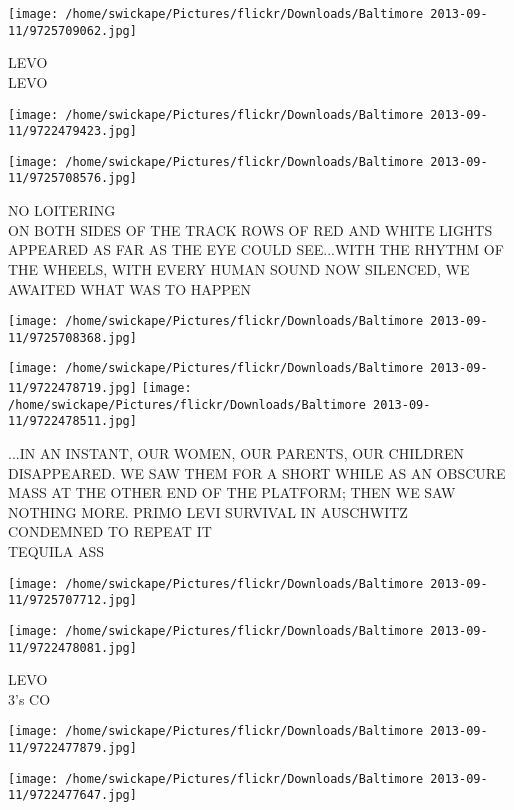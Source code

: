 \documentclass[10pt,letterpaper]{article}
\begin{document}
\vspace{0.25in}
\texttt{[image: /home/swickape/Pictures/flickr/Downloads/Baltimore 2013-09-11/9725709062.jpg]}

LEVO\\
LEVO
\pagebreak

\texttt{[image: /home/swickape/Pictures/flickr/Downloads/Baltimore 2013-09-11/9722479423.jpg]}

\vspace{0.25in}
\texttt{[image: /home/swickape/Pictures/flickr/Downloads/Baltimore 2013-09-11/9725708576.jpg]}

NO LOITERING\\
ON BOTH SIDES OF THE TRACK ROWS OF RED AND WHITE LIGHTS APPEARED AS FAR AS THE EYE COULD SEE...WITH THE RHYTHM OF THE WHEELS, WITH EVERY HUMAN SOUND NOW SILENCED, WE AWAITED WHAT WAS TO HAPPEN
\pagebreak

\texttt{[image: /home/swickape/Pictures/flickr/Downloads/Baltimore 2013-09-11/9725708368.jpg]}

\vspace{0.25in}
\texttt{[image: /home/swickape/Pictures/flickr/Downloads/Baltimore 2013-09-11/9722478719.jpg]}
\texttt{[image: /home/swickape/Pictures/flickr/Downloads/Baltimore 2013-09-11/9722478511.jpg]}

...IN AN INSTANT, OUR WOMEN, OUR PARENTS, OUR CHILDREN DISAPPEARED.  WE SAW THEM FOR A SHORT WHILE AS AN OBSCURE MASS AT THE OTHER END OF THE PLATFORM; THEN WE SAW NOTHING MORE.  PRIMO LEVI  SURVIVAL IN AUSCHWITZ\\
CONDEMNED TO REPEAT IT\\
TEQUILA ASS
\pagebreak

\texttt{[image: /home/swickape/Pictures/flickr/Downloads/Baltimore 2013-09-11/9725707712.jpg]}

\vspace{0.25in}
\texttt{[image: /home/swickape/Pictures/flickr/Downloads/Baltimore 2013-09-11/9722478081.jpg]}

LEVO\\
3's CO
\pagebreak

\texttt{[image: /home/swickape/Pictures/flickr/Downloads/Baltimore 2013-09-11/9722477879.jpg]}

\vspace{0.25in}
\texttt{[image: /home/swickape/Pictures/flickr/Downloads/Baltimore 2013-09-11/9722477647.jpg]}
\end{document}
